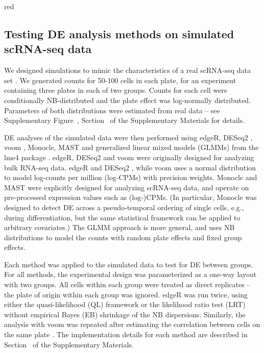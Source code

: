\documentclass[oupdraft]{bio}
\begin{document}
\begin{color}{red}
\subsection{Testing DE analysis methods on simulated scRNA-seq data}
We designed simulations to mimic the characteristics of a real scRNA-seq data set \citep{kolod2015single}.
We generated counts for 50-100 cells in each plate, for an experiment containing three plates in each of two groups.
Counts for each cell were conditionally NB-distributed and the plate effect was log-normally distributed.
Parameters of both distributions were estimated from real data -- see Supplementary Figure~\suppparamsim{}, Section~\suppsimulation{} of the Supplementary Materials for details.

DE analyses of the simulated data were then performed using edgeR, DESeq2 \citep{love2014moderated}, voom \citep{law2014voom}, Monocle, MAST \citep{finak2015mast} and generalized linear mixed models (GLMMs) from the lme4 package \citep{bates2015fitting}.
edgeR, DESeq2 and voom were originally designed for analyzing bulk RNA-seq data.
edgeR and DESeq2 , while voom uses a normal distribution to model log-counts per million (log-CPMs) with precision weights.
Monocle and MAST were explicitly designed for analyzing scRNA-seq data, and operate on pre-processed expression values such as (log-)CPMs.
(In particular, Monocle was designed to detect DE across a pseudo-temporal ordering of single cells, e.g., during differentiation, but the same statistical framework can be applied to arbitrary covariates.)
The GLMM approach is more general, and uses NB distributions to model the counts with random plate effects and fixed group effects.
\end{color}

Each method was applied to the simulated data to test for DE between groups. 
For all methods, the experimental design was parameterized as a one-way layout with two groups.
All cells within each group were treated as direct replicates -- the plate of origin within each group was ignored.
edgeR was run twice, using either the quasi-likelihood (QL) framework \citep{lund2012detecting} 
    or the likelihood ratio test (LRT) \citep{mccarthy2012differential} without empirical Bayes (EB) shrinkage of the NB dispersions.
Similarly, the analysis with voom was repeated after estimating the correlation between cells on the same plate \citep{smyth2005use}.
The implementation details for each method are described in Section~\suppimplementation{} of the Supplementary Materials.
\end{document}
